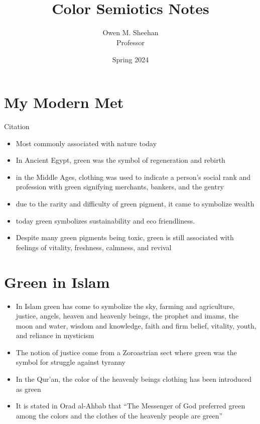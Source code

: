 \documentclass[12pt]{article}
\title{\class{}\\Color Semiotics Notes}
\author{Owen M. Sheehan\\Professor \prof{}}
\date{Spring 2024}
\begin{document}
\maketitle
\tableofcontents
\newpage
    \section{My Modern Met}
    Citation \autocite{ModernMet}
        \begin{itemize}
            \item Most commonly associated with nature today
            \item In Ancient Egypt, green was the symbol of regeneration and rebirth
            \item in the Middle Ages, clothing was used to indicate a person's social rank and profession with green signifying merchants, bankers, and the gentry
            \item due to the rarity and difficulty of green pigment, it came to symbolize wealth
            \item today green symbolizes sustainability and eco friendliness.
            \item Despite many green pigments being toxic, green is still associated with feelings of vitality, freshness, calmness, and revival
        \end{itemize}
    \section{Green in Islam}
        \begin{itemize}
            \item In Islam green has come to symbolize the sky, farming and agriculture, justice, angels, heaven and heavenly beings, the prophet and imams, the moon and water, wisdom and knowledge, faith and firm belief, vitality, youth, and reliance in mysticism \autocite[26]{Islam}
            \item The notion of justice come from a Zoroastrian sect where green was the symbol for struggle against tyranny \autocite[27]{Islam}
            \item In the Qur'an, the color of the heavenly beings clothing has been introduced as green \autocite[27]{Islam}
            \item It is stated in Orad al-Ahbab that ``The Messenger of God preferred green among the colors and the clothes of the heavenly people are green'' \autocite[28]{Islam}
        \end{itemize}
\end{document}
